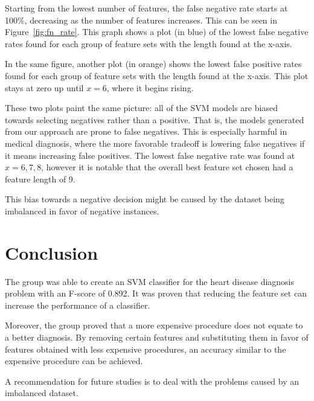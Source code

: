 \documentclass[conference]{IEEEtran}
\begin{document}
	Starting from the lowest number of features, the false negative rate starts at 100\%, decreasing as the number of features increases.
	This can be seen in Figure~\ref{fig:fn_rate}.
	This graph shows a plot (in blue) of the lowest false negative rates found for each group of feature sets with the length found at the x-axis.

	In the same figure, another plot (in orange) shows the lowest false positive rates found for each group of feature sets with the length found at the x-axis.
	This plot stays at zero up until $x=6$, where it begins rising.

	These two plots paint the same picture: all of the SVM models are biased
	towards selecting negatives rather than a positive.
	That is, the models generated from our approach are prone to false negatives.
	This is especially harmful in medical diagnosis, where the more favorable tradeoff is lowering false negatives if it means increasing false positives.
	The lowest false negative rate was found at $x=6,7,8$, however it is notable that the overall best feature set chosen had a feature length of 9.

	This bias towards a negative decision might be caused by the dataset being imbalanced in favor of negative instances.

\section{Conclusion}
	The group was able to create an SVM classifier for the heart disease diagnosis problem with an F-score of 0.892.
	It was proven that reducing the feature set can increase the performance of a classifier.

	Moreover, the group proved that a more expensive procedure does not equate to a better diagnosis.
	By removing certain features and substituting them in favor of features obtained with less expensive procedures, an accuracy similar to the expensive procedure can be achieved.

	A recommendation for future studies is to deal with the problems caused by an imbalanced dataset.
\end{document}
